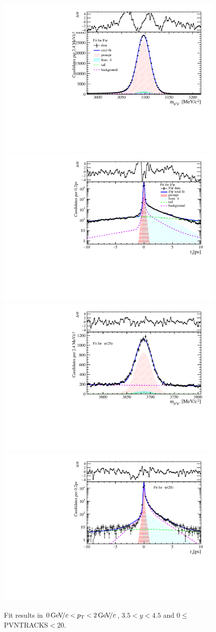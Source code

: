 \begin{figure}[H]
\begin{center}
\includegraphics[width=0.47\linewidth]{pdf/Jpsi/drawmass/n1y3pt1.pdf}
\includegraphics[width=0.47\linewidth]{pdf/Jpsi/2DFit/n1y3pt1.pdf}
\vspace*{-0.5cm}
\includegraphics[width=0.47\linewidth]{pdf/Psi2S/drawmass/n1y3pt1.pdf}
\includegraphics[width=0.47\linewidth]{pdf/Psi2S/2DFit/n1y3pt1.pdf}
\vspace*{-0.5cm}
\end{center}
\caption{Fit results in $0\text{\,Ge\kern -0.1em V\!/}c<p_{\mathrm{T}}<2\text{\,Ge\kern -0.1em V\!/}c$, $3.5<y<4.5$ and 0$\leq$PVNTRACKS$<$20.}
\label{Fitn1y3pt1}
\end{figure}
